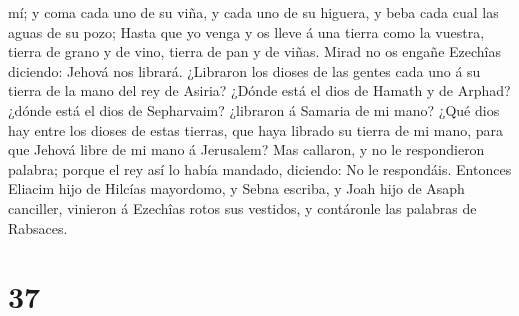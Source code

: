 mí; y coma cada uno de su viña, y cada uno de su higuera, y beba cada
cual las aguas de su pozo;  Hasta que yo venga y os lleve
á una tierra como la vuestra, tierra de grano y de vino, tierra de pan y
de viñas.  Mirad no os engañe Ezechîas diciendo: Jehová
nos librará. ¿Libraron los dioses de las gentes cada uno á su tierra de
la mano del rey de Asiria?  ¿Dónde está el dios de Hamath
y de Arphad? ¿dónde está el dios de Sepharvaim? ¿libraron á Samaria de
mi mano?  ¿Qué dios hay entre los dioses de estas
tierras, que haya librado su tierra de mi mano, para que Jehová libre de
mi mano á Jerusalem?  Mas callaron, y no le respondieron
palabra; porque el rey así lo había mandado, diciendo: No le respondáis.
 Entonces Eliacim hijo de Hilcías mayordomo, y Sebna
escriba, y Joah hijo de Asaph canciller, vinieron á Ezechîas rotos sus
vestidos, y contáronle las palabras de Rabsaces.

\hypertarget{section-36}{%
\section{37}\label{section-36}}

